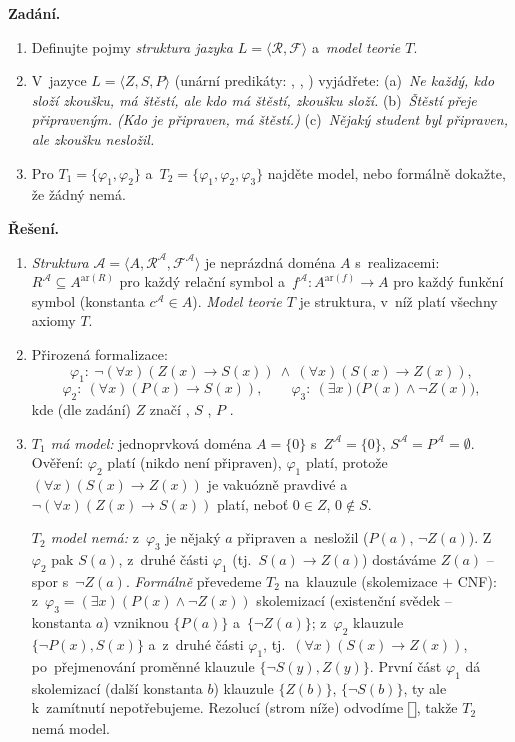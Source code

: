 \documentclass[11pt,a4paper]{article}
\newcommand{\eclause}{\mathord{\text{\framebox[1.25ex][c]{\rule{0pt}{0.95ex}}}}}
\begin{document}
\begin{priklad} \par
\textbf{Zadání.}
\begin{enumerate}[label=(\arabic*)]
  \item Definujte pojmy \emph{struktura jazyka $L=\langle\mathcal R,\mathcal F\rangle$} a~\emph{model teorie $T$}.
  \item V~jazyce $L=\langle Z,S,P\rangle$ (unární predikáty: , , ) vyjádřete: (a)~\emph{Ne každý, kdo složí zkoušku, má štěstí, ale kdo má štěstí, zkoušku složí.} (b)~\emph{Štěstí přeje připraveným. (Kdo je připraven, má štěstí.)} (c)~\emph{Nějaký student byl připraven, ale zkoušku nesložil.}
  \item Pro $T_1=\{\varphi_1,\varphi_2\}$ a~$T_2=\{\varphi_1,\varphi_2,\varphi_3\}$ najděte model, nebo formálně dokažte, že žádný nemá.
\end{enumerate}

\smallskip
\textbf{Řešení.}
\begin{enumerate}[label=(\arabic*)]
  \item \emph{Struktura} $\mathcal A=\langle A,\mathcal R^{\mathcal A},\mathcal F^{\mathcal A}\rangle$ je neprázdná doména $A$ s~realizacemi: $R^{\mathcal A}\subseteq A^{\mathrm{ar}(R)}$ pro každý relační symbol a~$f^{\mathcal A}\colon A^{\mathrm{ar}(f)}\to A$ pro každý funkční symbol (konstanta $c^{\mathcal A}\in A$). \emph{Model teorie $T$} je struktura, v~níž platí všechny axiomy $T$.
  \item Přirozená formalizace:
    \[
    \varphi_1:\ \neg(\forall x)(Z(x)\to S(x))\ \wedge\ (\forall x)(S(x)\to Z(x)),
    \]
    \[
    \varphi_2:\ (\forall x)(P(x)\to S(x)),\qquad
    \varphi_3:\ (\exists x)\big(P(x)\wedge\neg Z(x)\big),
    \]
    kde (dle zadání) $Z$ značí , $S$ , $P$ .
  \item \emph{$T_1$ má model:} jednoprvková doména $A=\{0\}$ s~$Z^{\mathcal A}=\{0\}$, $S^{\mathcal A}=P^{\mathcal A}=\emptyset$. Ověření: $\varphi_2$ platí (nikdo není připraven), $\varphi_1$ platí, protože $(\forall x)(S(x)\to Z(x))$ je vakuózně pravdivé a~$\neg(\forall x)(Z(x)\to S(x))$ platí, neboť $0\in Z$, $0\notin S$.\par
    \emph{$T_2$ model nemá:} z~$\varphi_3$ je nějaký $a$ připraven a~nesložil ($P(a)$, $\neg Z(a)$). Z~$\varphi_2$ pak $S(a)$, z~druhé části $\varphi_1$ (tj.\ $S(a)\to Z(a)$) dostáváme $Z(a)$ -- spor s~$\neg Z(a)$. \emph{Formálně} převedeme $T_2$ na~klauzule (skolemizace $+$ CNF): z~$\varphi_3=(\exists x)(P(x)\wedge\neg Z(x))$ skolemizací (existenční svědek -- konstanta $a$) vzniknou $\{P(a)\}$ a~$\{\neg Z(a)\}$; z~$\varphi_2$ klauzule $\{\neg P(x),S(x)\}$ a~z~druhé části $\varphi_1$, tj.\ $(\forall x)(S(x)\to Z(x))$, po~přejmenování proměnné klauzule $\{\neg S(y),Z(y)\}$. První část $\varphi_1$ dá skolemizací (další konstanta $b$) klauzule $\{Z(b)\}$, $\{\neg S(b)\}$, ty ale k~zamítnutí nepotřebujeme. Rezolucí (strom níže) odvodíme $\eclause$, takže $T_2$ nemá model.
\end{enumerate}


\end{priklad}
\end{document}
